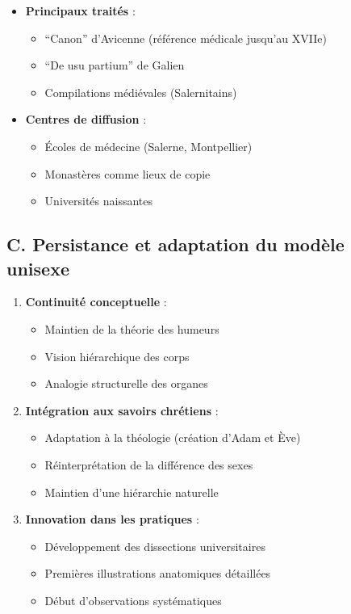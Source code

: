 \documentclass[
  letterpaper,
  DIV=11,
  numbers=noendperiod]{scrreprt}
\providecommand{\tightlist}{%
  \setlength{\itemsep}{0pt}\setlength{\parskip}{0pt}}\usepackage{longtable,booktabs,array}
\begin{document}
\begin{itemize}
\tightlist
\item
  \textbf{Principaux traités} :

  \begin{itemize}
  \tightlist
  \item
    ``Canon'' d'Avicenne (référence médicale jusqu'au XVIIe)
  \item
    ``De usu partium'' de Galien
  \item
    Compilations médiévales (Salernitains)
  \end{itemize}
\item
  \textbf{Centres de diffusion} :

  \begin{itemize}
  \tightlist
  \item
    Écoles de médecine (Salerne, Montpellier)
  \item
    Monastères comme lieux de copie
  \item
    Universités naissantes
  \end{itemize}
\end{itemize}

\subsection{C. Persistance et adaptation du modèle
unisexe}\label{c.-persistance-et-adaptation-du-moduxe8le-unisexe}

\begin{enumerate}
\def\labelenumi{\arabic{enumi}.}
\tightlist
\item
  \textbf{Continuité conceptuelle} :

  \begin{itemize}
  \tightlist
  \item
    Maintien de la théorie des humeurs
  \item
    Vision hiérarchique des corps
  \item
    Analogie structurelle des organes
  \end{itemize}
\item
  \textbf{Intégration aux savoirs chrétiens} :

  \begin{itemize}
  \tightlist
  \item
    Adaptation à la théologie (création d'Adam et Ève)
  \item
    Réinterprétation de la différence des sexes
  \item
    Maintien d'une hiérarchie naturelle
  \end{itemize}
\item
  \textbf{Innovation dans les pratiques} :

  \begin{itemize}
  \tightlist
  \item
    Développement des dissections universitaires
  \item
    Premières illustrations anatomiques détaillées
  \item
    Début d'observations systématiques
  \end{itemize}
\end{enumerate}
\end{document}
